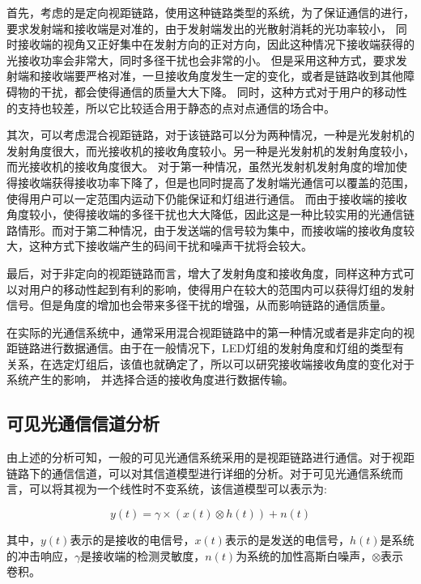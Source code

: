 首先，考虑的是定向视距链路，使用这种链路类型的系统，为了保证通信的进行，要求发射端和接收端是对准的，由于发射端发出的光散射消耗的光功率较小，
同时接收端的视角又正好集中在发射方向的正对方向，因此这种情况下接收端获得的光接收功率会非常大，同时多径干扰也会非常的小。
但是采用这种方式，要求发射端和接收端要严格对准，一旦接收角度发生一定的变化，或者是链路收到其他障碍物的干扰，都会使得通信的质量大大下降。
同时，这种方式对于用户的移动性的支持也较差，所以它比较适合用于静态的点对点通信的场合中。

其次，可以考虑混合视距链路，对于该链路可以分为两种情况，一种是光发射机的发射角度很大，而光接收机的接收角度较小。另一种是光发射机的发射角度较小，而光接收机的接收角度很大。
对于第一种情况，虽然光发射机发射角度的增加使得接收端获得接收功率下降了，但是也同时提高了发射端光通信可以覆盖的范围，使得用户可以一定范围内运动下仍能保证和灯组进行通信。
而由于接收端的接收角度较小，使得接收端的多径干扰也大大降低，因此这是一种比较实用的光通信链路情形。而对于第二种情况，由于发送端的信号较为集中，而接收端的接收角度较大，这种方式下接收端产生的码间干扰和噪声干扰将会较大。

最后，对于非定向的视距链路而言，增大了发射角度和接收角度，同样这种方式可以对用户的移动性起到有利的影响，使得用户在较大的范围内可以获得灯组的发射信号。但是角度的增加也会带来多径干扰的增强，从而影响链路的通信质量。

在实际的光通信系统中，通常采用混合视距链路中的第一种情况或者是非定向的视距链路进行数据通信。由于在一般情况下，LED灯组的发射角度和灯组的类型有关系，在选定灯组后，该值也就确定了，所以可以研究接收端接收角度的变化对于系统产生的影响，
并选择合适的接收角度进行数据传输。

\subsection{可见光通信信道分析}\label{sec:vlc-channel}
由上述的分析可知，一般的可见光通信系统采用的是视距链路进行通信。对于视距链路下的通信信道，可以对其信道模型进行详细的分析。对于可见光通信系统而言，可以将其视为一个线性时不变系统\cite{DingJuPeng2005}，该信道模型可以表示为:

\begin{equation}
    y(t) = \gamma \times (x(t) \otimes h(t)) + n(t)
    \label{equ:baseband-channel}
\end{equation}

其中，$y(t)$表示的是接收的电信号，$x(t)$表示的是发送的电信号，$h(t)$是系统的冲击响应，$\gamma$是接收端的检测灵敏度，$n(t)$为系统的加性高斯白噪声，$\otimes$表示卷积。

